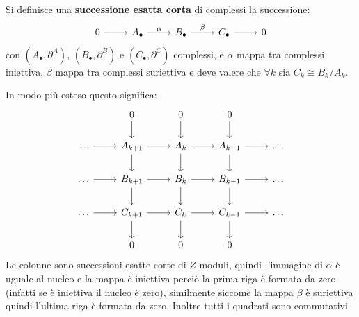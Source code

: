 \begin{definition}
  Si definisce una \textbf{successione esatta corta} di
  complessi la successione:
  \[
    \begin{tikzcd}
      0 \arrow{r}{} & A_\bullet \arrow{r}{\alpha} & B_\bullet \arrow{r}{\beta} & C_\bullet \arrow{r}{} & 0
    \end{tikzcd}
  \]
  con $ (A_\bullet, \partial^A) $, $ (B_\bullet, \partial^B) $ e $ (C_\bullet, \partial^C) $ complessi, e
  $ \alpha $ mappa tra complessi iniettiva, $ \beta $ mappa tra complessi suriettiva
  e deve valere che $ \forall k $ sia $ C_k \cong {B_k} \slash {A_k} $.
\end{definition}


In modo più esteso questo significa:
\[
  \begin{tikzcd}
    {} & 0 \arrow{d}{} & 0 \arrow{d}{} & 0 \arrow{d}{} & {} \\
    \dots \arrow{r}{} & A_{k+1} \arrow{r}{} \arrow{d}{} & A_{k} \arrow{r}{} \arrow{d}{} & A_{k-1} \arrow{r}{} \arrow{d}{} & \dots \\
    \dots \arrow{r}{} & B_{k+1} \arrow{r}{} \arrow{d}{} & B_{k} \arrow{r}{} \arrow{d}{} & B_{k-1} \arrow{r}{} \arrow{d}{} & \dots \\
    \dots \arrow{r}{} & C_{k+1} \arrow{r}{} \arrow{d}{} & C_{k} \arrow{r}{} \arrow{d}{} & C_{k-1} \arrow{r}{} \arrow{d}{} & \dots \\
    {} & 0 & 0 & 0 & {}
  \end{tikzcd}
\]
Le colonne sono successioni esatte corte di $ Z $-moduli, quindi
l'immagine di $ \alpha $ è uguale al nucleo e la mappa è iniettiva
perciò la prima riga è formata da zero (infatti se è
iniettiva il nucleo è zero), similmente siccome
la mappa $ \beta $ è suriettiva quindi l'ultima
riga è formata da zero.
Inoltre tutti i quadrati sono commutativi.
